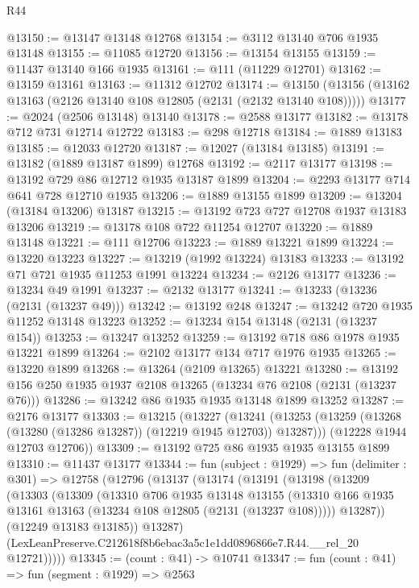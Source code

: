 \begin{lexlean}{R44}
\begin{coremodule}
@13150 := @13147 @13148 @12768
@13154 := @3112 @13140 @706 @1935 @13148
@13155 := @11085 @12720
@13156 := @13154 @13155
@13159 := @11437 @13140 @166 @1935
@13161 := @111 (@11229 @12701)
@13162 := @13159 @13161
@13163 := @11312 @12702
@13174 := @13150 (@13156 (@13162 @13163 (@2126 @13140 @108 @12805 (@2131 (@2132 @13140 @108)))))
@13177 := @2024 (@2506 @13148) @13140
@13178 := @2588 @13177
@13182 := @13178 @712 @731 @12714 @12722
@13183 := @298 @12718
@13184 := @1889 @13183
@13185 := @12033 @12720
@13187 := @12027 (@13184 @13185)
@13191 := @13182 (@1889 @13187 @1899) @12768
@13192 := @2117 @13177
@13198 := @13192 @729 @86 @12712 @1935 @13187 @1899
@13204 := @2293 @13177 @714 @641 @728 @12710 @1935
@13206 := @1889 @13155 @1899
@13209 := @13204 (@13184 @13206) @13187
@13215 := @13192 @723 @727 @12708 @1937 @13183 @13206
@13219 := @13178 @108 @722 @11254 @12707
@13220 := @1889 @13148
@13221 := @111 @12706
@13223 := @1889 @13221 @1899
@13224 := @13220 @13223
@13227 := @13219 (@1992 @13224) @13183
@13233 := @13192 @71 @721 @1935 @11253 @1991 @13224
@13234 := @2126 @13177
@13236 := @13234 @49 @1991
@13237 := @2132 @13177
@13241 := @13233 (@13236 (@2131 (@13237 @49)))
@13242 := @13192 @248
@13247 := @13242 @720 @1935 @11252 @13148 @13223
@13252 := @13234 @154 @13148 (@2131 (@13237 @154))
@13253 := @13247 @13252
@13259 := @13192 @718 @86 @1978 @1935 @13221 @1899
@13264 := @2102 @13177 @134 @717 @1976 @1935
@13265 := @13220 @1899
@13268 := @13264 (@2109 @13265) @13221
@13280 := @13192 @156 @250 @1935 @1937 @2108 @13265 (@13234 @76 @2108 (@2131 (@13237 @76)))
@13286 := @13242 @86 @1935 @1935 @13148 @1899 @13252
@13287 := @2176 @13177
@13303 := @13215
    (@13227
      (@13241 (@13253 (@13259 (@13268 (@13280 (@13286 @13287)) (@12219 @1945 @12703)) @13287)))
      (@12228 @1944 @12703 @12706))
@13309 := @13192 @725 @86 @1935 @1935 @13155 @1899
@13310 := @11437 @13177
@13344 := fun (subject : @1929) =>
  fun (delimiter : @301) =>
  @12758
    (@12796
      (@13137
        (@13174
          (@13191
            (@13198
              (@13209
                (@13303
                  (@13309
                    (@13310
                      @706
                      @1935
                      @13148
                      @13155
                      (@13310 @166 @1935 @13161 @13163 (@13234 @108 @12805 (@2131 (@13237 @108)))))
                    @13287))
                (@12249 @13183 @13185))
              @13287)
            (LexLeanPreserve.C212618f8b6ebac3a5c1e1dd0896866e7.R44.__rel_20 @12721)))))
@13345 := (count : @41) -> @10741
@13347 := fun (count : @41) => fun (segment : @1929) => @2563

\end{coremodule}
\end{lexlean}
